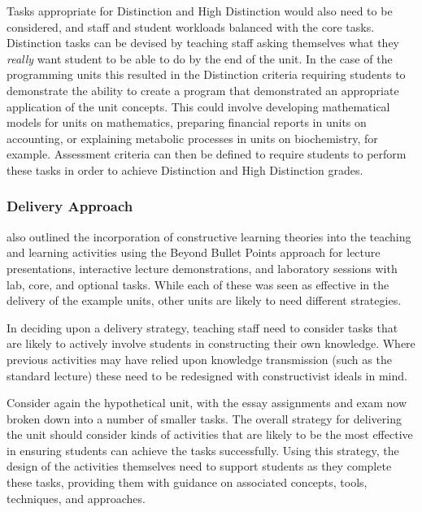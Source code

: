 Tasks appropriate for Distinction and High Distinction would also need to be considered, and staff and student workloads balanced with the core tasks. Distinction tasks can be devised by teaching staff asking themselves what they \emph{really} want student to be able to do by the end of the unit. In the case of the programming units this resulted in the Distinction criteria requiring students to demonstrate the ability to create a program that demonstrated an appropriate application of the unit concepts. This could involve developing mathematical models for units on mathematics, preparing financial reports in units on accounting, or explaining metabolic processes in units on biochemistry, for example. Assessment criteria can then be defined to require students to perform these tasks in order to achieve Distinction and High Distinction grades.



\subsubsection{Delivery Approach} %
\label{ssub:delivery_approach}

 also outlined the incorporation of constructive learning theories into the teaching and learning activities using the Beyond Bullet Points approach for lecture presentations, interactive lecture demonstrations, and laboratory sessions with lab, core, and  optional tasks. While each of these was seen as effective in the delivery of the example units, other units are likely to need different strategies. 

In deciding upon a delivery strategy, teaching staff need to consider tasks that are likely to actively involve students in constructing their own knowledge. Where previous activities may have relied upon knowledge transmission (such as the standard lecture) these need to be redesigned with constructivist ideals in mind.

Consider again the hypothetical unit, with the essay assignments and exam now broken down into a number of smaller tasks. The overall strategy for delivering the unit should consider kinds of activities that are likely to be the most effective in ensuring students can achieve the tasks successfully. Using this strategy, the design of the activities themselves need to support students as they complete these tasks, providing them with guidance on associated concepts, tools, techniques, and approaches.

